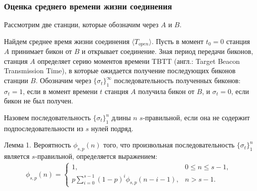 \subsubsection{Оценка среднего времени жизни соединения}
Рассмотрим две станции, которые обозначим через $A$ и $B$. %

Найдем среднее время жизни соединения $\langle T_{open} \rangle$. Пусть в момент $t_0=0$ станция $A$ принимает бикон от $B$ и открывает соединение. Зная период передачи биконов, станция $A$ определяет серию моментов времени TBTT (англ.: Target Beacon Transmission Time), в которые ожидается получение последующих биконов станции $B$. Обозначим через $\{\sigma_t\}_1^{\infty}$ последовательность полученных биконов: $\sigma_t = 1 $, если в момент времени $t$ станция $A$ получила бикон от $B$, и $\sigma_t = 0 $, если бикон не был получен.



Назовем последовательность $\{\sigma_t\}_1^n$ длины $n$ $s$-правильной, если она не содержит подпоследовательности из $s$ нулей подряд.


Лемма 1.\label{lm:0}
Вероятность $\phi_{s,p}(n)$ того, что произвольная последовательность $\{\sigma_t\}_1^n$ является $s$-правильной, определяется выражением:
 \begin{eqnarray}
 \label{eq:math:fi_final}
\phi_{s,p}(n) = \left\{ \begin{array}{ll}
                1, 					     & 0 \leq n \leq s-1, \\
                p \sum \limits^{s-1}_{i=0} (1-p)^i \phi_{s,p}(n-i-1), & n > s-1.
               \end{array} \right.
\end{eqnarray}
 
